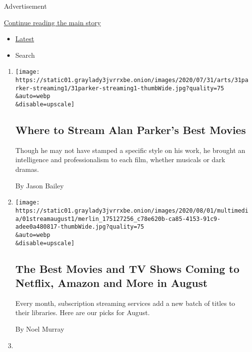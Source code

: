 Advertisement

\protect\hyperlink{after-mid1}{Continue reading the main story}

\begin{itemize}
\tightlist
\item
  \protect\hyperlink{stream-panel}{Latest}
\item
  Search
\end{itemize}

\begin{enumerate}
\def\labelenumi{\arabic{enumi}.}
\item
  \href{/2020/07/31/movies/alan-parker-stream.html}{}

  \texttt{[image: https://static01.graylady3jvrrxbe.onion/images/2020/07/31/arts/31parker-streaming1/31parker-streaming1-thumbWide.jpg?quality=75\\\&auto=webp\\\&disable=upscale]}

  \hypertarget{where-to-stream-alan-parkers-best-movies}{%
  \subsection{Where to Stream Alan Parker's Best
  Movies}\label{where-to-stream-alan-parkers-best-movies}}

  Though he may not have stamped a specific style on his work, he
  brought an intelligence and professionalism to each film, whether
  musicals or dark dramas.

  By Jason Bailey
\item
  \href{/2020/07/31/arts/television/new-to-stream-netflix.html}{}

  \texttt{[image: https://static01.graylady3jvrrxbe.onion/images/2020/08/01/multimedia/01streamaugust1/merlin\_175127256\_c78e620b-ca85-4153-91c9-adee0a480817-thumbWide.jpg?quality=75\\\&auto=webp\\\&disable=upscale]}

  \hypertarget{the-best-movies-and-tv-shows-coming-to-netflix-amazon-and-more-in-august}{%
  \subsection{The Best Movies and TV Shows Coming to Netflix, Amazon and
  More in
  August}\label{the-best-movies-and-tv-shows-coming-to-netflix-amazon-and-more-in-august}}

  Every month, subscription streaming services add a new batch of titles
  to their libraries. Here are our picks for August.

  By Noel Murray
\item
  \href{/2020/07/31/movies/comfort-viewing-terminator-2.html}{}


\end{enumerate}
